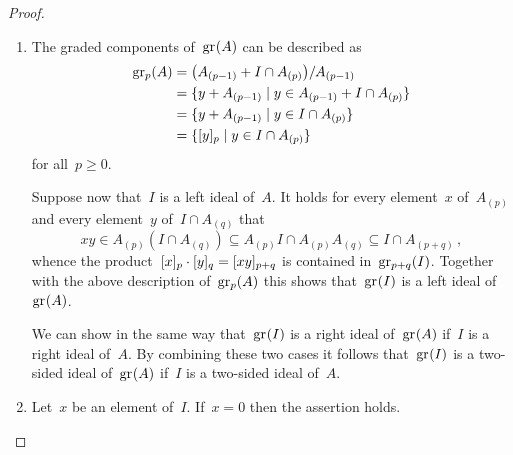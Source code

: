 \begin{proof}
  \leavevmode
  \begin{enumerate}
    \item
      The graded components of~$\gr(A)$ can be described as
      \begin{align*}
        \gr[p](A)
        &=
        \bigl( A_{(p-1)} + I \cap A_{(p)} \bigr) / A_{(p-1)}
        \\
        &=
        \{
          y + A_{(p-1)}
        \suchthat
          y \in A_{(p-1)} + I \cap A_{(p)}
        \}
        \\
        &=
        \{
          y + A_{(p-1)}
        \suchthat
          y \in I \cap A_{(p)}
        \}
        \\
        &=
        \{
          \fclass{ y }_{p}
        \suchthat
          y \in I \cap A_{(p)}
        \}
      \end{align*}
      for all~$p \geq 0$.

      Suppose now that~$I$ is a left ideal of~$A$.
      It holds for every element~$x$ of~$A_{(p)}$ and every element~$y$ of~$I \cap A_{(q)}$ that
      \[
        xy
        \in
        A_{(p)} (I \cap A_{(q)})
        \subseteq
        A_{(p)} I \cap A_{(p)} A_{(q)}
        \subseteq
        I \cap A_{(p+q)} \,,
      \]
      whence the product~$\lbrack x\rbrack_p \cdot \lbrack y\rbrack_q = [xy]_{p+q}$ is contained in~$\gr[p+q](I)$.
      Together with the above description of~$\gr[p](A)$ this shows that~$\gr(I)$ is a left ideal of~$\gr(A)$.

      We can show in the same way that~$\gr(I)$ is a right ideal of~$\gr(A)$ if~$I$ is a right ideal of~$A$.
      By combining these two cases it follows that~$\gr(I)$ is a two-sided ideal of~$\gr(A)$ if~$I$ is a two-sided ideal of~$A$.
    \item
      Let~$x$ be an element of~$I$.
      If~$x = 0$ then the assertion holds.


\end{enumerate}
\end{proof}

